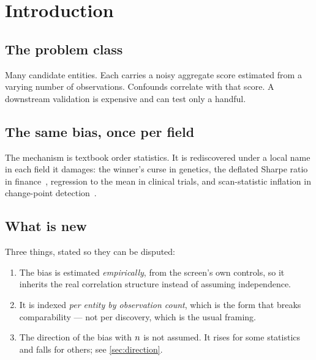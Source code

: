 \section{Introduction}
\label{sec:intro}



\subsection{The problem class}
\label{sec:problem}

Many candidate entities. Each carries a noisy aggregate score estimated from a varying number
of observations. Confounds correlate with that score. A downstream validation is expensive and
can test only a handful.

\subsection{The same bias, once per field}
\label{sec:names}

The mechanism is textbook order statistics. It is rediscovered under a local name in each
field it damages: the winner's curse in genetics, the deflated Sharpe ratio in
finance~\cite{bailey2014deflated}, regression to the mean in clinical trials, and
scan-statistic inflation in change-point detection~\cite{darling1956limit}.

\subsection{What is new}
\label{sec:contribution}

Three things, stated so they can be disputed:
\begin{enumerate}
  \item The bias is estimated \emph{empirically}, from the screen's own controls, so it
        inherits the real correlation structure instead of assuming independence.
  \item It is indexed \emph{per entity by observation count}, which is the form that breaks
        comparability --- not per discovery, which is the usual framing.
  \item The direction of the bias with $n$ is not assumed. It rises for some statistics
        and falls for others; see \cref{sec:direction}.
\end{enumerate}
